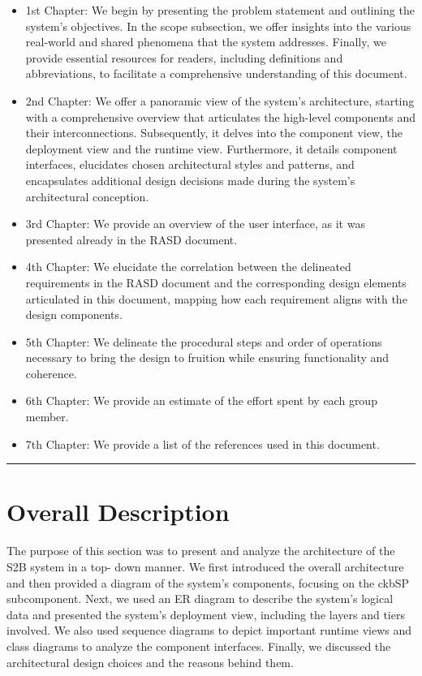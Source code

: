 \documentclass{Configuration_Files/Template}
\begin{document}
\begin{itemize}
\item \textcolor{bluepoli}{1st Chapter:} We begin by presenting the problem statement and outlining the system's objectives. In the scope subsection, we offer insights into the various real-world and shared phenomena that the system addresses. Finally, we provide essential resources for readers, including definitions and abbreviations, to facilitate a comprehensive understanding of this document.
\item \textcolor{bluepoli}{2nd Chapter:} We offer a panoramic view of the system's architecture, starting with a comprehensive overview that articulates the high-level components and their interconnections. Subsequently, it delves into the component view, the deployment view and the runtime view. Furthermore, it details component interfaces, elucidates chosen architectural styles and patterns, and encapsulates additional design decisions made during the system's architectural conception.
\item \textcolor{bluepoli}{3rd Chapter:} We provide an overview of the user interface, as it was presented already in the RASD document.
\item \textcolor{bluepoli}{4th Chapter:} We elucidate the correlation between the delineated requirements in the RASD document and the corresponding design elements articulated in this document, mapping how each requirement aligns with the design components.
\item \textcolor{bluepoli}{5th Chapter:} We delineate the procedural steps and order of operations necessary to bring the design to fruition while ensuring functionality and coherence.
\item \textcolor{bluepoli}{6th Chapter:} We provide an estimate of the effort spent by each group member.
\item \textcolor{bluepoli}{7th Chapter:} We provide a list of the references used in this document.
\end{itemize}

{\color{bluepoli}\rule{\linewidth}{0.1pt}}

\chapter{Overall Description}

The purpose of this section was to present and analyze the architecture of the S2B system in a top- down manner. We first introduced the overall architecture and then provided a diagram of the system’s components, focusing on the ckbSP subcomponent. Next, we used an ER diagram to describe the system’s logical data and presented the system’s deployment view, including the layers and tiers involved. We also used sequence diagrams to depict important runtime views and class diagrams to analyze the component interfaces. Finally, we discussed the architectural design choices and the reasons behind them.
\end{document}
